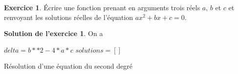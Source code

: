 \documentclass[a4paper, 11pt,openany]{article}%
\theoremstyle{plain}
\theoremstyle{definition}
\newtheorem{exo}{Exercice}
\newtheorem{sol}{Solution de l'exercice}
\theoremstyle{remark}
\begin{document}
\begin{exo}
Écrire une fonction prenant en arguments trois réels $a$, $b$ et $c$ et renvoyant les solutions réelles de l'équation $ax^2 + bx + c = 0$.
\end{exo}

\begin{sol}
On a
\begin{center}
\begin{algorithm}
$ delta=b**2-4*a*c$ \;
$solutions=[]$ \;
\caption{Résolution d'une équation du second degré}
\end{algorithm}
\end{center}
\end{sol}
\end{document}
